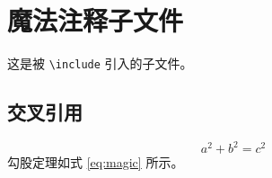 
\section{魔法注释子文件}

这是被 \texttt{\textbackslash include} 引入的子文件。

\subsection{交叉引用}

\begin{equation}
    \label{eq:magic}
    a^2 + b^2 = c^2
\end{equation}
勾股定理如式 \eqref{eq:magic} 所示。
